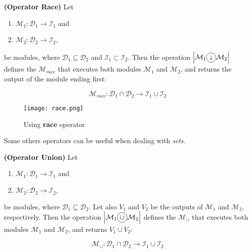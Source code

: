 \begin{definition}\label{op:race}
{\bf (Operator Race)} Let 
\begin{enumerate}%
	\item $\mathcal{M}_1 : \mathcal{D}_1 \rightarrow \mathcal{I}_1$ and  
	\item $\mathcal{M}_2 : \mathcal{D}_2 \rightarrow \mathcal{I}_2$,
\end{enumerate}%
be modules, where $\mathcal{D}_1 \subseteq \mathcal{D}_2$ and $\mathcal{I}_1 \subset \mathcal{I}_2$. Then the operation $\left|\mathcal{M}_1\circled{$\shortdownarrow$}\mathcal{M}_2\right|$ defines the \cm{} $\mathcal{M}_{race}$ that executes both modules $\mathcal{M}_1$ and $\mathcal{M}_2$, and returns the output of the module ending first:

\[
\mathcal{M}_{race}:\mathcal{D}_1\cap\mathcal{D}_2 \rightarrow \mathcal{I}_1 \cup \mathcal{I}_2 
\]
\end{definition}


\begin{figure}[h]
	\centering	
	\texttt{[image: race.png]}
	\caption{Using {\bf race} operator}\label{fig:race_example}
\end{figure}

Some others operators can be useful when dealing with {\it sets}.

\begin{definition}\label{op:union}
{\bf (Operator Union)} Let 
\begin{enumerate}%
	\item $\mathcal{M}_1 : \mathcal{D}_1 \rightarrow \mathcal{I}_1$ and  
	\item $\mathcal{M}_2 : \mathcal{D}_2 \rightarrow \mathcal{I}_2$,
\end{enumerate}%
be modules, where $\mathcal{D}_1 \subseteq \mathcal{D}_2$. %
Let also $V_1$ and $V_2$ be the outputs of $\mathcal{M}_1$ and $\mathcal{M}_2$, respectively. Then the operation $\left|\mathcal{M}_1\circled{$\cup$}\mathcal{M}_2\right|$ defines the \cm{} $\mathcal{M}_{\cup}$ that executes both modules $\mathcal{M}_1$ and $\mathcal{M}_2$, and returns $V_1\cup V_2$:

\[
\mathcal{M}_{\cup}:\mathcal{D}_1\cap\mathcal{D}_2 \rightarrow \mathcal{I}_1 \cup \mathcal{I}_2
\]
\end{definition}

